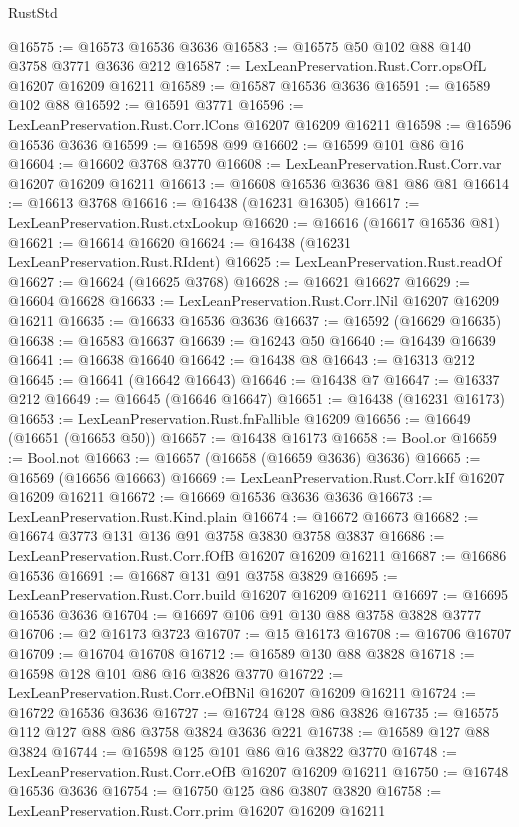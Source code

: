 \begin{lexlean}{RustStd}
\begin{coremodule}
@16575 := @16573 @16536 @3636
@16583 := @16575 @50 @102 @88 @140 @3758 @3771 @3636 @212
@16587 := LexLeanPreservation.Rust.Corr.opsOfL @16207 @16209 @16211
@16589 := @16587 @16536 @3636
@16591 := @16589 @102 @88
@16592 := @16591 @3771
@16596 := LexLeanPreservation.Rust.Corr.lCons @16207 @16209 @16211
@16598 := @16596 @16536 @3636
@16599 := @16598 @99
@16602 := @16599 @101 @86 @16
@16604 := @16602 @3768 @3770
@16608 := LexLeanPreservation.Rust.Corr.var @16207 @16209 @16211
@16613 := @16608 @16536 @3636 @81 @86 @81
@16614 := @16613 @3768
@16616 := @16438 (@16231 @16305)
@16617 := LexLeanPreservation.Rust.ctxLookup
@16620 := @16616 (@16617 @16536 @81)
@16621 := @16614 @16620
@16624 := @16438 (@16231 LexLeanPreservation.Rust.RIdent)
@16625 := LexLeanPreservation.Rust.readOf
@16627 := @16624 (@16625 @3768)
@16628 := @16621 @16627
@16629 := @16604 @16628
@16633 := LexLeanPreservation.Rust.Corr.lNil @16207 @16209 @16211
@16635 := @16633 @16536 @3636
@16637 := @16592 (@16629 @16635)
@16638 := @16583 @16637
@16639 := @16243 @50
@16640 := @16439 @16639
@16641 := @16638 @16640
@16642 := @16438 @8
@16643 := @16313 @212
@16645 := @16641 (@16642 @16643)
@16646 := @16438 @7
@16647 := @16337 @212
@16649 := @16645 (@16646 @16647)
@16651 := @16438 (@16231 @16173)
@16653 := LexLeanPreservation.Rust.fnFallible @16209
@16656 := @16649 (@16651 (@16653 @50))
@16657 := @16438 @16173
@16658 := Bool.or
@16659 := Bool.not
@16663 := @16657 (@16658 (@16659 @3636) @3636)
@16665 := @16569 (@16656 @16663)
@16669 := LexLeanPreservation.Rust.Corr.kIf @16207 @16209 @16211
@16672 := @16669 @16536 @3636 @3636
@16673 := LexLeanPreservation.Rust.Kind.plain
@16674 := @16672 @16673
@16682 := @16674 @3773 @131 @136 @91 @3758 @3830 @3758 @3837
@16686 := LexLeanPreservation.Rust.Corr.fOfB @16207 @16209 @16211
@16687 := @16686 @16536
@16691 := @16687 @131 @91 @3758 @3829
@16695 := LexLeanPreservation.Rust.Corr.build @16207 @16209 @16211
@16697 := @16695 @16536 @3636
@16704 := @16697 @106 @91 @130 @88 @3758 @3828 @3777
@16706 := @2 @16173 @3723
@16707 := @15 @16173
@16708 := @16706 @16707
@16709 := @16704 @16708
@16712 := @16589 @130 @88 @3828
@16718 := @16598 @128 @101 @86 @16 @3826 @3770
@16722 := LexLeanPreservation.Rust.Corr.eOfBNil @16207 @16209 @16211
@16724 := @16722 @16536 @3636
@16727 := @16724 @128 @86 @3826
@16735 := @16575 @112 @127 @88 @86 @3758 @3824 @3636 @221
@16738 := @16589 @127 @88 @3824
@16744 := @16598 @125 @101 @86 @16 @3822 @3770
@16748 := LexLeanPreservation.Rust.Corr.eOfB @16207 @16209 @16211
@16750 := @16748 @16536 @3636
@16754 := @16750 @125 @86 @3807 @3820
@16758 := LexLeanPreservation.Rust.Corr.prim @16207 @16209 @16211

\end{coremodule}
\end{lexlean}
